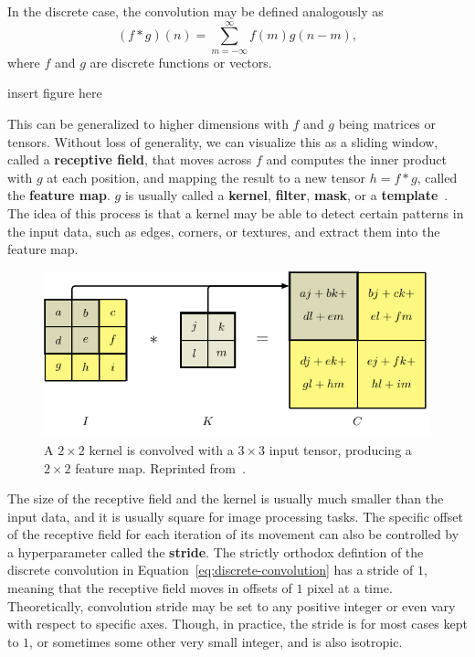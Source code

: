 \documentclass[12pt]{report}
\theoremstyle{definition}
\theoremstyle{remark}
\begin{document}
In the discrete case, the convolution may be defined analogously as
\begin{equation}\label{eq:discrete-convolution}
    (f * g)(n) = \sum_{m=-\infty}^{\infty} f(m) g(n - m),
\end{equation}
where $f$ and $g$ are discrete functions or vectors.

insert figure here

This can be generalized to higher dimensions with $f$ and $g$ being matrices or tensors. Without loss of generality, we can visualize this as a sliding window, called a \textbf{receptive field}, that moves across $f$ and computes the inner product with $g$ at each position, and mapping the result to a new tensor $h = f * g$, called the \textbf{feature map}. $g$ is usually called a \textbf{kernel}, \textbf{filter}, \textbf{mask}, or a \textbf{template}~\cite{moon_general_2025}. The idea of this process is that a kernel may be able to detect certain patterns in the input data, such as edges, corners, or textures, and extract them into the feature map.

\begin{figure}
    \centering
    \includegraphics[width=0.7\linewidth]{figs/2d_convolution.pdf}
    \caption{A $2 \times 2$ kernel is convolved with a $3 \times 3$ input tensor, producing a $2 \times 2$ feature map. Reprinted from~\cite{bishop_deep_2023}.}
    \label{fig:2d-convolution}
\end{figure}

The size of the receptive field and the kernel is usually much smaller than the input data, and it is usually square for image processing tasks. The specific offset of the receptive field for each iteration of its movement can also be controlled by a hyperparameter called the \textbf{stride}. The strictly orthodox defintion of the discrete convolution in Equation~\ref{eq:discrete-convolution} has a stride of $1$, meaning that the receptive field moves in offsets of $1$ pixel at a time. Theoretically, convolution stride may be set to any positive integer or even vary with respect to specific axes. Though, in practice, the stride is for most cases kept to $1$, or sometimes some other very small integer, and is also isotropic.
\end{document}
